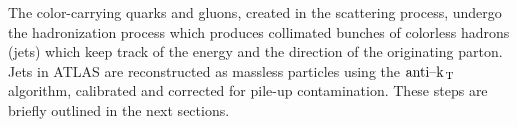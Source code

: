 The color-carrying quarks and gluons, created in the scattering process, undergo
the hadronization process which produces collimated bunches of colorless hadrons
(jets) which keep track of the energy and the direction of the originating
parton. Jets in ATLAS are reconstructed as massless particles using the
\emph{$\text{anti--k}_\mathrm{\, T}$} algorithm, calibrated and corrected for pile-up
contamination. These steps are briefly outlined in the next sections.
